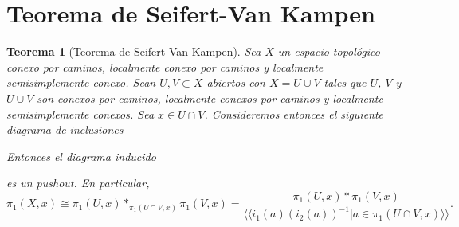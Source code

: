 \documentclass[12pt,a4paper]{book}
\newtheorem{thm}{Teorema}[section]
\theoremstyle{definition} \newtheorem{defn}[thm]{Definición}
\theoremstyle{definition} \newtheorem{ejemplo}[thm]{Ejemplo}
\theoremstyle{definition} \newtheorem{ejercicio}[thm]{Ejercicio}
\theoremstyle{remark} \newtheorem*{obs}{Observación}
\def\gf{\pi_1}
\begin{document}
\section{Teorema de Seifert-Van Kampen}
\begin{thm}[Teorema de Seifert-Van Kampen]
 Sea $X$ un espacio topológico conexo por caminos, localmente conexo por caminos y localmente semisimplemente conexo. Sean $U,V\subset X$ abiertos con $X=U\cup V$ tales que $U$, $V$ y $U\cup V$ son conexos por caminos, localmente conexos por caminos y localmente semisimplemente conexos. Sea $x\in U\cap V$. Consideremos entonces el siguiente diagrama de inclusiones
 \begin{center}
 \end{center}
 Entonces el diagrama inducido
 \begin{center}
 \end{center}
 es un pushout. En particular, $$\gf(X,x)\cong \gf(U,x)*_{\gf(U\cap V,x)}\gf(V,x)=\frac{\gf(U,x)*\gf(V,x)}{\langle \langle i_1(a)(i_2(a))^{-1}|a\in \gf(U\cap V,x)\rangle \rangle}.$$
\end{thm}
\end{document}
